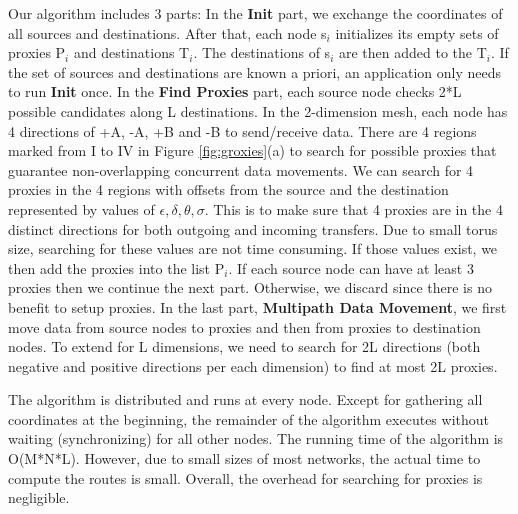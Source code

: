 Our algorithm includes 3 parts: In the \textbf{Init} part, we exchange the coordinates of all sources and destinations. After that, each node s$_i$ initializes its empty sets of proxies P$_i$ and destinations T$_i$. The destinations of s$_i$ are then added to the T$_i$. If the set of sources and destinations are known a priori, an application only needs to run \textbf{Init} once. In the \textbf{Find Proxies} part, each source node checks 2*L possible candidates along L destinations. In the 2-dimension mesh, each node has 4 directions of +A, -A, +B and -B to send/receive data. There are 4 regions marked from I to IV in Figure \ref{fig:groxies}(a) to search for possible proxies that guarantee non-overlapping concurrent data movements. We can search for 4 proxies in the 4 regions with offsets from the source and the destination represented by values of $\epsilon, \delta, \theta, \sigma$. This is to make sure that 4 proxies are in the 4 distinct directions for both outgoing and incoming transfers.  Due to small torus size, searching for these values are not time consuming. If those values exist, we then add the proxies into the list P$_i$. If each source node can have at least 3 proxies then we continue the next part. Otherwise, we discard since there is no benefit to setup proxies. In the last part, \textbf{Multipath Data Movement}, we first move data from source nodes to proxies and then from proxies to destination nodes. To extend for L dimensions, we need to search for 2L directions (both negative and positive directions per each dimension) to find at most 2L proxies.

The algorithm is distributed and runs at every node. Except for gathering all coordinates at the beginning, the remainder of the algorithm executes without waiting (synchronizing) for all other nodes. The running time of the algorithm is O(M*N*L). However, due to small sizes of most networks, the actual time to compute the routes is small. Overall, the overhead for searching for proxies is negligible.

